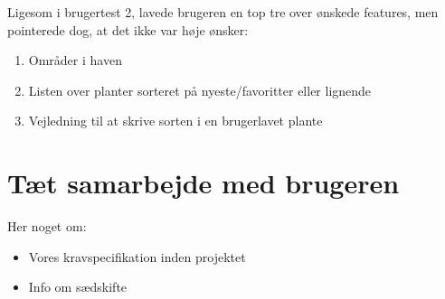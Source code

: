 Ligesom i brugertest 2, lavede brugeren en top tre over ønskede features, men pointerede dog, at det ikke var høje ønsker:

\begin{enumerate}
        \item Områder i haven
        \item Listen over planter sorteret på nyeste/favoritter eller lignende
        \item Vejledning til at skrive sorten i en brugerlavet plante 
\end{enumerate}

\section{Tæt samarbejde med brugeren}
Her noget om:
\begin{itemize}
    \item Vores kravspecifikation inden projektet
    \item Info om sædskifte
\end{itemize} 

